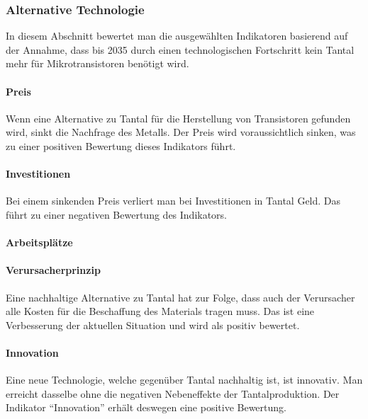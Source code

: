 \subsubsection{Alternative Technologie}
In diesem Abschnitt bewertet man die ausgewählten Indikatoren basierend auf der
Annahme, dass bis 2035 durch einen technologischen Fortschritt kein Tantal mehr
für Mikrotransistoren benötigt wird.

\paragraph{Preis}
Wenn eine Alternative zu Tantal für die Herstellung von Transistoren gefunden
wird, sinkt die Nachfrage des Metalls. Der Preis wird voraussichtlich sinken,
was zu einer positiven Bewertung dieses Indikators führt.

\paragraph{Investitionen}
Bei einem sinkenden Preis verliert man bei Investitionen in Tantal Geld. Das
führt zu einer negativen Bewertung des Indikators.

\paragraph{Arbeitsplätze}

\paragraph{Verursacherprinzip}
Eine nachhaltige Alternative zu Tantal hat zur Folge, dass auch der Verursacher
alle Kosten für die Beschaffung des Materials tragen muss. Das ist eine
Verbesserung der aktuellen Situation und wird als positiv bewertet.

\paragraph{Innovation}
Eine neue Technologie, welche gegenüber Tantal nachhaltig ist, ist innovativ.
Man erreicht dasselbe ohne die negativen Nebeneffekte der Tantalproduktion. Der
Indikator ``Innovation'' erhält deswegen eine positive Bewertung.

\fi
